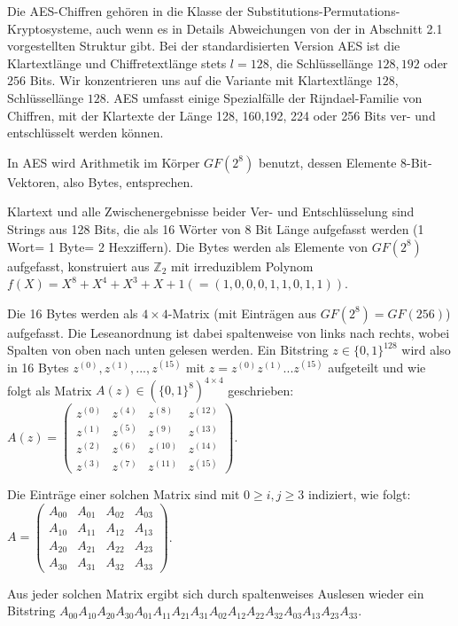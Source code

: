 \documentclass[a4paper]{article}
\begin{document}
\begin{multicols}{3}
    Die AES-Chiffren gehören in die Klasse der Substitutions-Permutations-Kryptosysteme, auch wenn es in Details Abweichungen von der in Abschnitt 2.1 vorgestellten Struktur gibt. Bei der standardisierten Version AES ist die Klartextlänge und Chiffretextlänge stets $l= 128$, die Schlüssellänge $128,192$ oder $256$ Bits. Wir konzentrieren uns auf die Variante mit Klartextlänge $128$, Schlüssellänge $128$. AES umfasst einige Spezialfälle der Rijndael-Familie von Chiffren, mit der Klartexte der Länge 128, 160,192, 224 oder 256 Bits ver- und entschlüsselt werden können.

    In AES wird Arithmetik im Körper $GF(2^8)$ benutzt, dessen Elemente $8$-Bit-Vektoren, also Bytes, entsprechen.

    Klartext und alle Zwischenergebnisse beider Ver- und Entschlüsselung sind Strings aus 128 Bits, die als 16 Wörter von 8 Bit Länge aufgefasst werden (1 Wort= 1 Byte= 2 Hexziffern). Die Bytes werden als Elemente von $GF(2^8)$ aufgefasst, konstruiert aus $\mathbb{Z}_2$ mit irreduziblem Polynom $f(X) =X^8 +X^4 +X^3 +X+ 1 (= (1, 0 , 0 , 0 , 1 , 1 , 0 , 1 ,1) )$.

    Die 16 Bytes werden als $4\times 4$-Matrix (mit Einträgen aus $GF(2^8)=GF(256)$) aufgefasst. Die Leseanordnung ist dabei spaltenweise von links nach rechts, wobei Spalten von oben nach unten gelesen werden. Ein Bitstring $z\in\{0,1\}^{128}$ wird also in 16 Bytes $z^{(0)},z^{(1)},...,z^{(15)}$ mit $z=z^{(0)}z^{(1)}...z^{(15)}$ aufgeteilt und wie folgt als Matrix $A(z)\in(\{0,1\}^8)^{4\times 4}$ geschrieben: $A(z) =\begin{pmatrix} z^{(0)}& z^{(4)}& z^{(8)}& z^{(12)} \\ z^{(1)}& z^{(5)}& z^{(9)}& z^{(13)} \\ z^{(2)}& z^{(6)}& z^{(10)}& z^{(14)} \\ z^{(3)}& z^{(7)}& z^{(11)}& z^{(15)} \end{pmatrix}$.

    Die Einträge einer solchen Matrix sind mit $0\geq i,j\geq 3$ indiziert, wie folgt: $A=\begin{pmatrix} A_{00}& A_{01}& A_{02}& A_{03}\\ A_{10}& A_{11}& A_{12}& A_{13}\\ A_{20}& A_{21}& A_{22}& A_{23}\\ A_{30}& A_{31}& A_{32}& A_{33}\end{pmatrix}$.

    Aus jeder solchen Matrix ergibt sich durch spaltenweises Auslesen wieder ein Bitstring $A_{00} A_{10} A_{20} A_{30} A_{01} A_{11} A_{21} A_{31} A_{02} A_{12} A_{22} A_{32} A_{03} A_{13} A_{23} A_{33}$.


\end{multicols}
\end{document}
